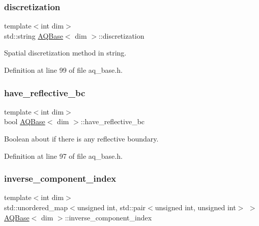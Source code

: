 \mbox{\label{class_a_q_base_a6c454af11008e235340a7b8e31a02114}} 
\subsubsection{\texorpdfstring{discretization}{discretization}}
{\footnotesize\ttfamily template$<$int dim$>$ \\
std\+::string \hyperlink{class_a_q_base}{A\+Q\+Base}$<$ dim $>$\+::discretization\hspace{0.3cm}{\ttfamily [protected]}}



Spatial discretization method in string. 



Definition at line 99 of file aq\+\_\+base.\+h.

\mbox{\label{class_a_q_base_a8afa1e0da5bbb4846e495178e165b5b5}} 
\subsubsection{\texorpdfstring{have\+\_\+reflective\+\_\+bc}{have\_reflective\_bc}}
{\footnotesize\ttfamily template$<$int dim$>$ \\
bool \hyperlink{class_a_q_base}{A\+Q\+Base}$<$ dim $>$\+::have\+\_\+reflective\+\_\+bc\hspace{0.3cm}{\ttfamily [protected]}}



Boolean about if there is any reflective boundary. 



Definition at line 97 of file aq\+\_\+base.\+h.

\mbox{\label{class_a_q_base_a657640cc73cef6130bdf5b325dd0fd11}} 
\subsubsection{\texorpdfstring{inverse\+\_\+component\+\_\+index}{inverse\_component\_index}}
{\footnotesize\ttfamily template$<$int dim$>$ \\
std\+::unordered\+\_\+map$<$unsigned int, std\+::pair$<$unsigned int, unsigned int$>$ $>$ \hyperlink{class_a_q_base}{A\+Q\+Base}$<$ dim $>$\+::inverse\+\_\+component\+\_\+index\hspace{0.3cm}{\ttfamily [protected]}}

